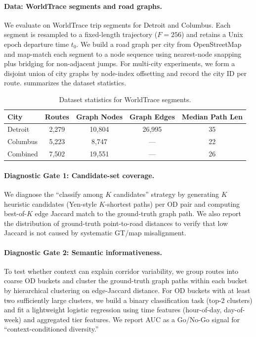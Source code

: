 
\paragraph{Data: WorldTrace segments and road graphs.}
We evaluate on WorldTrace trip segments for Detroit and Columbus.
Each segment is resampled to a fixed-length trajectory ($F=256$) and retains a Unix epoch departure time $t_0$.
We build a road graph per city from OpenStreetMap and map-match each segment to a node sequence using nearest-node snapping plus bridging for non-adjacent jumps.
For multi-city experiments, we form a disjoint union of city graphs by node-index offsetting and record the city ID per route.
 summarizes the dataset statistics.

\begin{table}[t]
  \caption{Dataset statistics for WorldTrace segments.}
  \label{tab:data-stats}
  \vskip 0.1in
  \centering
  \small
  \begin{tabular}{lcccc}
    \toprule
    City & Routes & Graph Nodes & Graph Edges & Median Path Len \\
    \midrule
    Detroit & 2,279 & 10,804 & 26,995 & 35 \\
    Columbus & 5,223 & 8,747 & --- & 22 \\
    Combined & 7,502 & 19,551 & --- & 26 \\
    \bottomrule
  \end{tabular}
  \vskip -0.1in
\end{table}

\paragraph{Diagnostic Gate 1: Candidate-set coverage.}
We diagnose the ``classify among $K$ candidates'' strategy by generating $K$ heuristic candidates (Yen-style $K$-shortest paths) per OD pair and computing best-of-$K$ edge Jaccard match to the ground-truth graph path.
We also report the distribution of ground-truth point-to-road distances to verify that low Jaccard is not caused by systematic GT/map misalignment.

\paragraph{Diagnostic Gate 2: Semantic informativeness.}
To test whether context can explain corridor variability, we group routes into coarse OD buckets and cluster the ground-truth graph paths within each bucket by hierarchical clustering on edge-Jaccard distance.
For OD buckets with at least two sufficiently large clusters, we build a binary classification task (top-2 clusters) and fit a lightweight logistic regression using time features (hour-of-day, day-of-week) and aggregated tier features.
We report AUC as a Go/No-Go signal for ``context-conditioned diversity.''

